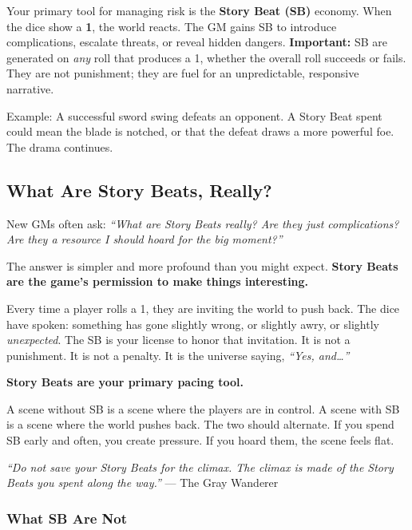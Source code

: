 Your primary tool for managing risk is the \textbf{Story Beat (SB)} economy. When the dice show a \textbf{1}, the world reacts. The GM gains SB to introduce complications, escalate threats, or reveal hidden dangers. \textbf{Important:} SB are generated on \emph{any} roll that produces a 1, whether the overall roll succeeds or fails. They are not punishment; they are fuel for an unpredictable, responsive narrative.

Example: A successful sword swing defeats an opponent. A Story Beat spent could mean the blade is notched, or that the defeat draws a more powerful foe. The drama continues.

\subsection{What Are Story Beats, Really?}
\label{sub:what-are-story-beats}

New GMs often ask: \textit{``What are Story Beats really? Are they just complications? Are they a resource I should hoard for the big moment?''}

The answer is simpler and more profound than you might expect. \textbf{Story Beats are the game's permission to make things interesting.}

Every time a player rolls a 1, they are inviting the world to push back. The dice have spoken: something has gone slightly wrong, or slightly awry, or slightly \emph{unexpected}. The SB is your license to honor that invitation. It is not a punishment. It is not a penalty. It is the universe saying, \textit{``Yes, and\dots''}

\begin{tcolorbox}[colback=yellow!5!white,colframe=yellow!75!black,title=The GM's Secret Weapon,breakable]
\textbf{Story Beats are your primary pacing tool.}

A scene without SB is a scene where the players are in control. A scene with SB is a scene where the world pushes back. The two should alternate. If you spend SB early and often, you create pressure. If you hoard them, the scene feels flat.

\noindent\textit{``Do not save your Story Beats for the climax. The climax is made of the Story Beats you spent along the way.''}
--- The Gray Wanderer
\end{tcolorbox}

\subsubsection{What SB Are Not}

